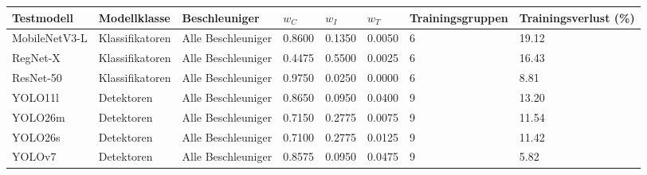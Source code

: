 \begin{tabular}{@{}llllllll@{}}
\toprule
Testmodell & Modellklasse & Beschleuniger & $w_C$ & $w_I$ & $w_T$ & Trainingsgruppen & Trainingsverlust (\%) \\
\midrule
MobileNetV3-L & Klassifikatoren & Alle Beschleuniger & 0.8600 & 0.1350 & 0.0050 & 6 & 19.12 \\
RegNet-X & Klassifikatoren & Alle Beschleuniger & 0.4475 & 0.5500 & 0.0025 & 6 & 16.43 \\
ResNet-50 & Klassifikatoren & Alle Beschleuniger & 0.9750 & 0.0250 & 0.0000 & 6 & 8.81 \\
YOLO11l & Detektoren & Alle Beschleuniger & 0.8650 & 0.0950 & 0.0400 & 9 & 13.20 \\
YOLO26m & Detektoren & Alle Beschleuniger & 0.7150 & 0.2775 & 0.0075 & 9 & 11.54 \\
YOLO26s & Detektoren & Alle Beschleuniger & 0.7100 & 0.2775 & 0.0125 & 9 & 11.42 \\
YOLOv7 & Detektoren & Alle Beschleuniger & 0.8575 & 0.0950 & 0.0475 & 9 & 5.82 \\
\bottomrule
\end{tabular}
